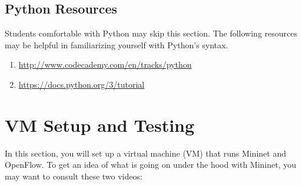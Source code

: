 \documentclass{article}
\begin{document}

\subsection{Python Resources}


Students comfortable with Python may skip this section.
The following resources may be helpful in familiarizing yourself with Python's syntax.

\begin{enumerate}
    \item \url{http://www.codecademy.com/en/tracks/python}
    \item \url{https://docs.python.org/3/tutorial}
\end{enumerate}


\section{VM Setup and Testing}

In this section, you will set up a virtual machine (VM) that runs Mininet and OpenFlow.
To get an idea of what is going on under the hood with Mininet, you may want to consult these two videos:
\end{document}
